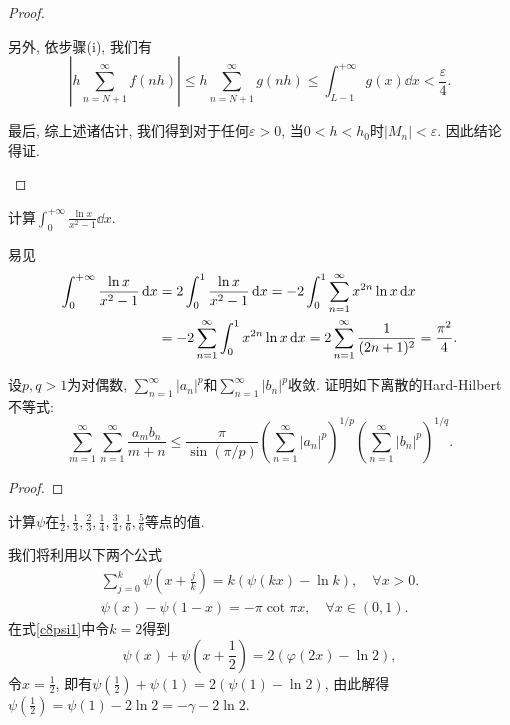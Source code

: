 \begin{quizb}
\begin{proof}
\begin{asparaenum}[\bfseries (i)]
\item 另外, 依步骤(i), 我们有\[\left|h\sum_{n=N+1}^{\infty}f(nh)\right|\leqslant h\sum_{n=N+1}^{\infty}g(nh)\leqslant\int_{L-1}^{+\infty}g(x)\dd x<\frac{\varepsilon}{4}.\]
\item 最后, 综上述诸估计, 我们得到对于任何\(\varepsilon>0\), 当\(0<h<h_0\)时\(|M_n|<\varepsilon.\) 因此结论得证.\qedhere
\end{asparaenum}
\end{proof}
\woe 计算\(\int_{0}^{+\infty}\frac{\ln x}{x^2-1}\dd x\).
\begin{solution}
易见
\[\begin{split}
\int_{0}^{+\infty}\frac{\ln x}{x^2-1}\,\mathrm{d} x&=2\int_{0}^{1}\frac{\ln x}{x^2-1}\,\mathrm{d} x=-2\int_{0}^{1}\sum_{n=1}^{\infty}x^{2n}\ln x\,\mathrm{d} x\\&=-2\sum_{n=1}^{\infty}\int_{0}^{1}x^{2n}\ln x\,\mathrm{d} x=2\sum_{n=1}^{\infty}\frac{1}{(2n+1)^2}=\frac{\pi^2}{4}.\qedhere
\end{split}\]
\end{solution}
\woe 设\(p,q>1\)为对偶数, \(\sum_{n=1}^{\infty}|a_n|^p\)和\(\sum_{n=1}^{\infty}|b_n|^p\)收敛. 证明如下离散的Hard-Hilbert不等式:\[\sum_{m=1}^{\infty}\sum_{n=1}^{\infty}\frac{a_mb_n}{m+n}\leqslant\frac{\pi}{\sin(\pi/p)}\left(\sum_{n=1}^{\infty}|a_n|^p \right)^{1/p}\left(\sum_{n=1}^{\infty}|b_n|^p\right)^{1/q}.\]
\begin{proof}
	
\end{proof}
\woe 计算\(\psi\)在\(\frac{1}{2},\frac{1}{3},\frac{2}{3},\frac{1}{4},\frac{3}{4},\frac{1}{6},\frac{5}{6}\)等点的值.
\begin{solution}
我们将利用以下两个公式\begin{gather}
\sum_{j=0}^{k}\psi\left(x+\frac{j}{k}\right)=k\left(\psi(kx)-\ln k\right),\quad\forall x>0.\tag{$\heartsuit$}\label{c8psi1}\\
\psi(x)-\psi(1-x)=-\pi\cot\pi x,\quad\forall x\in(0,1).\tag{$\spadesuit$}\label{c8psi2}
\end{gather}
在式\eqref{c8psi1}中令\(k=2\)得到\[\psi(x)+\psi\left(x+\frac{1}{2}\right)=2\left(\varphi(2x)-\ln 2\right),\]令\(x=\frac{1}{2}\), 即有\(\psi\left(\frac{1}{2}\right)+\psi\left(1\right)=2\left(\psi(1)-\ln 2\right)\), 由此解得\(\psi\left(\frac{1}{2}\right)=\psi(1)-2\ln 2=-\gamma-2\ln 2.\)


\end{solution}
\end{quizb}
